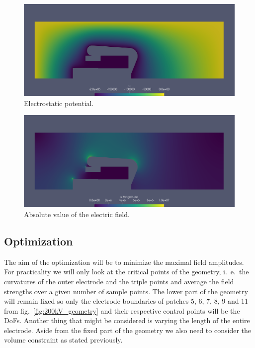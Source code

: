 \begin{center}
\begin{figure}[H]
  \includegraphics[width=\textwidth]{figures/200kV/potential}
  \caption{Electrostatic potential.}
  \label{fig:200kV_potential}
\end{figure}
\end{center}

\begin{center}
\begin{figure}[H]
  \includegraphics[width=\textwidth]{figures/200kV/gradient}
  \caption{Absolute value of the electric field.}
  \label{fig:200kV_electric_field}
\end{figure}
\end{center}

\subsection{Optimization}
The aim of the optimization will be to minimize the maximal field amplitudes. For practicality we will only look at the critical points of the geometry, i.~e.~the curvatures of the outer electrode and the triple points and average the field strengths over a given number of sample points. The lower part of the geometry will remain fixed so only the electrode boundaries of patches 5, 6, 7, 8, 9 and 11 from fig.~\ref{fig:200kV_geometry} and their respective control points will be the DoFs. Another thing that might be considered is varying the length of the entire electrode. Aside from the fixed part of the geometry we also need to consider the volume constraint as stated previously.

